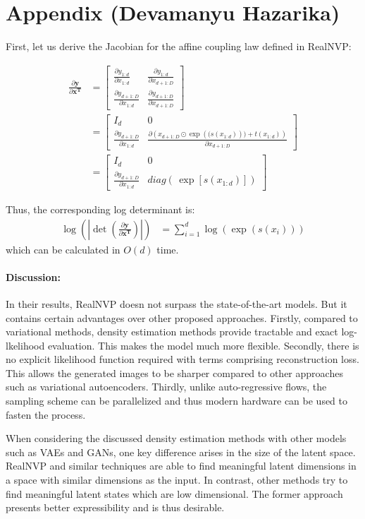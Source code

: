 \documentclass[runningheads]{llncs}
\begin{document}
\section{Appendix (Devamanyu Hazarika)}

First, let us derive the Jacobian for the affine coupling law defined in RealNVP:

\begin{align*}
\frac{\partial \mathbf{y}}{\partial \mathbf{x^T}} &= \begin{bmatrix}
\frac{\partial y_{1:d}}{\partial x_{1:d}} & \frac{\partial y_{1:d}}{\partial x_{d+1:D}} \\
\frac{\partial y_{d+1:D}}{\partial x_{1:d}} & \frac{\partial y_{d+1:D}}{\partial x_{d+1:D}} 
\end{bmatrix}\\
&= \begin{bmatrix}
I_{d} & 0 \\
\frac{\partial y_{d+1:D}}{\partial x_{1:d}} & \frac{\partial \left(x_{d+1:D} \odot \exp\left((s(x_{1:d})\right)) + t(x_{1:d})\right)}{\partial x_{d+1:D}} 
\end{bmatrix}\\
&= \begin{bmatrix}
I_{d} & 0 \\
\frac{\partial y_{d+1:D}}{\partial x_{1:d}} & diag\left(\,\exp[s(x_{1:d})]\right)
\end{bmatrix}
\end{align*}

Thus, the corresponding log determinant is:
\begin{align*}
\log\left( \left|\det(\frac{\partial \mathbf{y}}{\partial \mathbf{x^T}})\right|\right) &= \sum_{i=1}^{d}{\log(\exp(s(x_i)))}
\end{align*}
which can be calculated in $O(d)$ time.

\paragraph{Discussion:}
In their results, RealNVP doesn not surpass the state-of-the-art models. But it contains certain advantages over other proposed approaches. Firstly, compared to variational methods, density estimation methods provide tractable and exact log-lkelihood evaluation. This makes the model much more flexible. Secondly, there is no explicit likelihood function required with terms comprising reconstruction loss. This allows the generated images to be sharper compared to other approaches such as variational autoencoders. Thirdly, unlike auto-regressive flows, the sampling scheme can be parallelized and thus modern hardware can be used to fasten the process.

When considering the discussed density estimation methods with other models such as VAEs and GANs, one key difference arises in the size of the latent space. RealNVP and similar techniques are able to find meaningful latent dimensions in a space with similar dimensions as the input. In contrast, other methods try to find meaningful latent states which are low dimensional. The former approach presents better expressibility and is thus desirable. 
\end{document}
